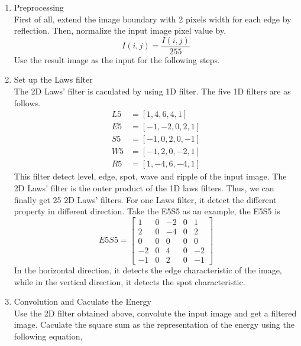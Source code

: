 \documentclass[11pt]{article}
\begin{document}
\begin{enumerate}
\item Preprocessing\\
First of all, extend the image boundary with 2 pixels width for each edge by reflection. Then, normalize the input image pixel value by,
\begin{equation}
I(i,j)= \frac { I(i,j) }{ 255 } 
\end{equation}
Use the result image as the input for the following steps.\par

\item Set up the Laws filter \\
The 2D Laws' filter is caculated by using 1D filter. The five 1D filters are as follows.
\begin{equation}
\begin{aligned}
L5&=[1,4,6,4,1]\\
E5&=[-1,-2,0,2,1]\\
S5&=[-1,0,2,0,-1]\\
W5&=[-1,2,0,-2,1]\\
R5&=[ 1,-4,6,-4,1]
\end{aligned}
\end{equation}
This filter detect level, edge, spot, wave and ripple of the input image.
The 2D Laws' filter is the outer product of the 1D laws filters. Thus, we can finally get 25 2D Laws' filters. For one Laws filter, it detect the different property in different direction. Take the E5S5 as an example, the E5S5 is  
\begin{equation}
E5S5=\begin{bmatrix} 1 & 0 & -2 & 0 & 1 \\ 2 & 0 & -4 & 0 & 2 \\ 0 & 0 & 0 & 0 & 0 \\ -2 & 0 & 4 & 0 & -2 \\ -1 & 0 & 2 & 0 & -1 \end{bmatrix}
\end{equation}
In the horizontal direction, it detects the edge characteristic of the image, while in the vertical direction, it detects the spot characteristic.\par
\item Convolution and Caculate the Energy\\
Use the 2D filter obtained above, convolute the input image and get a filtered image. Caculate the square sum as the representation of the energy using the following equation,


\end{enumerate}
\end{document}
